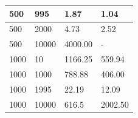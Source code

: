 \begin{table}[h]
\begin{tabular}{llll}
500  &     995  &     1.87  &    1.04 \\\hline
500  &     2000  &    4.73  &    2.52 \\\hline
500  &     10000  &   4000.00  & - \\ \hline
1000  &    10  &       1166.25  & 559.94 \\\hline
1000  &    1000  &    788.88  & 406.00 \\\hline
1000  &    1995  &    22.19  & 12.09 \\\hline
1000  &    10000  &   616.5  &   2002.50 \\\hline

\end{tabular}
\end{table}
